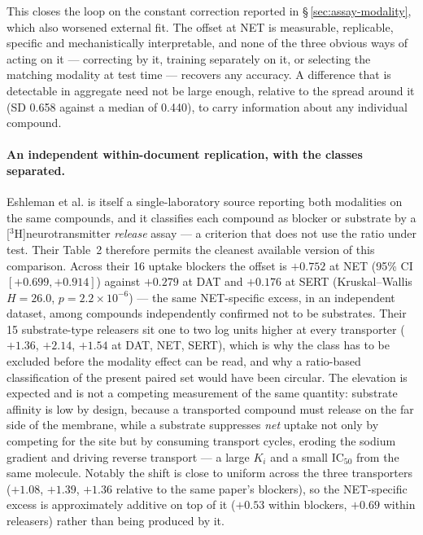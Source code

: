 \documentclass[11pt,a4paper]{article}
\begin{document}
This closes the loop on the constant correction reported in
\S\,\ref{sec:assay-modality}, which also worsened external fit. The offset at NET is
measurable, replicable, specific and mechanistically interpretable, and none of the
three obvious ways of acting on it --- correcting by it, training separately on it, or
selecting the matching modality at test time --- recovers any accuracy. A difference
that is detectable in aggregate need not be large enough, relative to the spread around
it (SD 0.658 against a median of 0.440), to carry information about any individual
compound.

\paragraph{An independent within-document replication, with the classes separated.}
Eshleman et al.\cite{Eshleman2017} is itself a single-laboratory source reporting both
modalities on the same compounds, and it classifies each compound as blocker or
substrate by a [$^3$H]neurotransmitter \emph{release} assay --- a criterion that does
not use the ratio under test. Their Table~2 therefore permits the cleanest available
version of this comparison. Across their 16 uptake blockers the offset is $+0.752$ at
NET (95\% CI $[+0.699,+0.914]$) against $+0.279$ at DAT and $+0.176$ at SERT
(Kruskal--Wallis $H=26.0$, $p=2.2\times10^{-6}$) --- the same NET-specific excess, in an
independent dataset, among compounds independently confirmed not to be substrates.
Their 15 substrate-type releasers sit one to two log units higher at every transporter
($+1.36$, $+2.14$, $+1.54$ at DAT, NET, SERT), which is why the class has to be excluded
before the modality effect can be read, and why a ratio-based classification of the
present paired set would have been circular. The elevation is expected and is not a
competing measurement of the same quantity: substrate affinity is low by design, because
a transported compound must release on the far side of the membrane, while a substrate
suppresses \emph{net} uptake not only by competing for the site but by consuming
transport cycles, eroding the sodium gradient and driving reverse transport --- a large
$K_i$ and a small IC$_{50}$ from the same molecule. Notably the shift is close to uniform
across the three transporters ($+1.08$, $+1.39$, $+1.36$ relative to the same paper's
blockers), so the NET-specific excess is approximately additive on top of it ($+0.53$
within blockers, $+0.69$ within releasers) rather than being produced by it.
\end{document}
